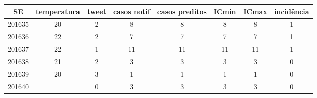 \begin{tabular}{c|ccccccc}
  \hline
SE & temperatura & tweet & casos notif & casos preditos & ICmin & ICmax & incidência \\ 
  \hline
201635 & 20 & 2 & 8 & 8 & 8 & 8 & 1 \\ 
  201636 & 22 & 2 & 7 & 7 & 7 & 7 & 1 \\ 
  201637 & 22 & 1 & 11 & 11 & 11 & 11 & 1 \\ 
  201638 & 21 & 2 & 3 & 3 & 3 & 3 & 0 \\ 
  201639 & 20 & 3 & 1 & 1 & 1 & 1 & 0 \\ 
  201640 &  & 0 & 3 & 3 & 3 & 3 & 0 \\ 
   \hline
\end{tabular}
